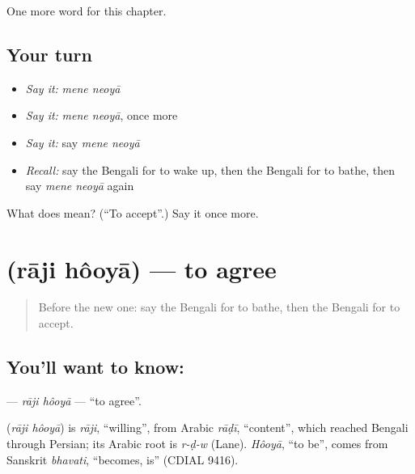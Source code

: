 \begin{grammarlens}[title={What you've built}]
One more word for this chapter.
\end{grammarlens}

\subsection*{Your turn}
\begin{itemize}
\raggedright
  \item \emph{Say it:} \emph{mene neoyā}
  \item \emph{Say it:} \emph{mene neoyā}, once more
  \item \emph{Say it:} say \emph{mene neoyā}
  \item \emph{Recall:} say the Bengali for to wake up, then the Bengali for to bathe, then say \emph{mene neoyā} again
\end{itemize}

\begin{tcolorbox}[breakable,colback=teal!4,colframe=teal!35!black,title={Before you move on}]
What does   mean? (\textquotedblleft{}To accept\textquotedblright{}.) Say it once more.
\end{tcolorbox}
\section[\texorpdfstring{\bn{রাজি} \bn{হওয়া} (rāji hôoyā)}{রাজি হওয়া (rāji hôoyā)}]{  (rāji hôoyā) — to agree}

\label{lesson:BN-C184-raji-hooya}



\begin{quote}
Before the new one: say the Bengali for to bathe, then the Bengali for to accept.
\end{quote}

\subsection*{You'll want to know:  }
\textbf{ } — \emph{rāji hôoyā} — \textquotedblleft{}to agree\textquotedblright{}.

\begin{cousinweb}
\textbf{ } (\emph{rāji hôoyā}) is \emph{rāji}, \textquotedblleft{}willing\textquotedblright{}, from Arabic \emph{rāḍī}, \textquotedblleft{}content\textquotedblright{}, which reached Bengali through Persian; its Arabic root is \emph{r-ḍ-w} (Lane). \emph{Hôoyā}, \textquotedblleft{}to be\textquotedblright{}, comes from Sanskrit \emph{bhavati}, \textquotedblleft{}becomes, is\textquotedblright{} (CDIAL 9416).
\end{cousinweb}

